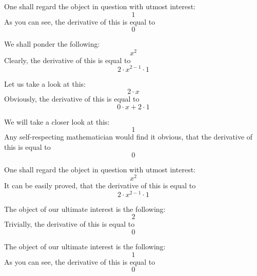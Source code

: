 \documentclass{article}
\begin{document}
One shall regard the object in question with utmost interest:
\begin{equation}
1 
\end{equation}
As you can see, the derivative of this is equal to
\begin{equation}
0 
\end{equation}

We shall ponder the following:
\begin{equation}
x ^{2 } 
\end{equation}
Clearly, the derivative of this is equal to
\begin{equation}
2 \cdot x ^{2 - 1 } \cdot 1 
\end{equation}

Let us take a look at this:
\begin{equation}
2 \cdot x 
\end{equation}
Obviously, the derivative of this is equal to
\begin{equation}
0 \cdot x + 2 \cdot 1 
\end{equation}

We will take a closer look at this:
\begin{equation}
1 
\end{equation}
Any self-respecting mathematician would find it obvious, that the derivative of this is equal to
\begin{equation}
0 
\end{equation}

One shall regard the object in question with utmost interest:
\begin{equation}
x ^{2 } 
\end{equation}
It can be easily proved, that the derivative of this is equal to
\begin{equation}
2 \cdot x ^{2 - 1 } \cdot 1 
\end{equation}

The object of our ultimate interest is the following:
\begin{equation}
2 
\end{equation}
Trivially, the derivative of this is equal to
\begin{equation}
0 
\end{equation}

The object of our ultimate interest is the following:
\begin{equation}
1 
\end{equation}
As you can see, the derivative of this is equal to
\begin{equation}
0 
\end{equation}
\end{document}
